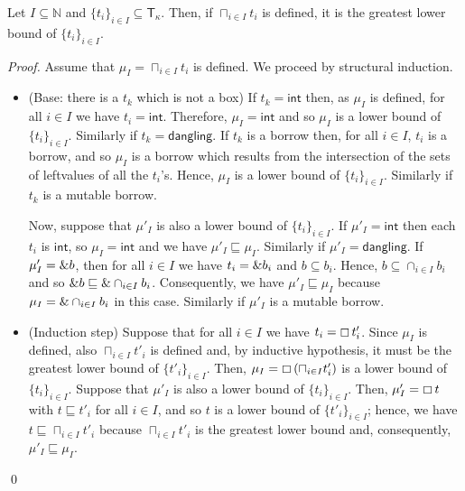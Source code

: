 \begin{lemma}\label{lemma:glb-type}
  Let $I\subseteq\mathbb{N}$ and $\{t_i\}_{i\in I}\subseteq\mathsf{T}_\kappa$.
  Then, if $\sqcap_{i\in I}t_i$ is defined, it is the greatest lower bound of $\{t_i\}_{i\in I}$.
\end{lemma}
\begin{proof}
  Assume that $\mu_I = \sqcap_{i\in I}t_i$ is defined.
  We proceed by structural induction.
  \begin{itemize}
    \item (Base: there is a $t_k$ which is not a box)
    If $t_k=\mathsf{int}$ then, as $\mu_I$ is defined, for all $i\in I$
    we have $t_i=\mathsf{int}$. Therefore, $\mu_I=\mathsf{int}$
    and so $\mu_I$ is a lower bound of $\{t_i\}_{i\in I}$.
    Similarly if $t_k=\mathsf{dangling}$.
    If $t_k$ is a borrow then, for all $i\in I$, $t_i$ is a borrow, and so
    $\mu_I$ is a borrow which results from the intersection of the sets of
    leftvalues of all the $t_i$'s. Hence, $\mu_I$ is a lower bound of
    $\{t_i\}_{i\in I}$.
    Similarly if $t_k$ is a mutable borrow.

    Now, suppose that $\mu'_I$ is also a lower bound of $\{t_i\}_{i\in I}$.
    If $\mu'_I=\mathsf{int}$ then each $t_i$ is $\mathsf{int}$, so
    $\mu_I=\mathsf{int}$ and we have $\mu'_I\sqsubseteq\mu_I$.
    Similarly if $\mu'_I=\mathsf{dangling}$.
    If $\mu'_I=\& b$, then for all $i\in I$ we have $t_i = \& b_i$
    and $b \subseteq b_i$. Hence, $b \subseteq \cap_{i\in I}b_i$ and so
    $\& b \sqsubseteq \&\cap_{i\in I}b_i$. Consequently, we have
    $\mu'_I\sqsubseteq\mu_I$ because $\mu_I=\&\cap_{i\in I}b_i$ in this case.
    Similarly if $\mu'_I$ is a mutable borrow.
    \item (Induction step) Suppose that for all $i\in I$ we have
    $t_i = \boxempty\,{t'_i}$. Since $\mu_I$ is defined, also
    $\sqcap_{i\in I}t'_i$ is defined and, by inductive hypothesis, it must be the greatest
    lower bound of $\{t'_i\}_{i\in I}$. Then,
    $\mu_I = \boxempty\,{(\sqcap_{i\in I}t'_i)}$ is a lower bound
    of $\{t_i\}_{i\in I}$. Suppose that $\mu'_I$ is also a lower bound
    of $\{t_i\}_{i\in I}$. Then, $\mu'_I=\boxempty\,{t}$ with
    $t\sqsubseteq t'_i$ for all $i\in I$, and so $t$ is a lower bound
    of $\{t'_i\}_{i\in I}$; hence, we have $t\sqsubseteq \sqcap_{i\in I}t'_i$
    because $\sqcap_{i\in I}t'_i$ is the greatest lower bound and,
    consequently, $\mu'_I\sqsubseteq\mu_I$.
  \end{itemize}
  \qed
\end{proof}

